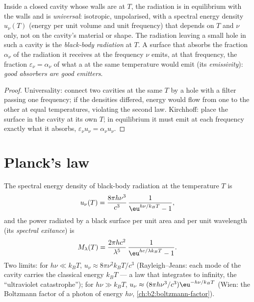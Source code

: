 \begin{proposition}\label{prop:b2:thermal-radiation:kirchhoff}
Inside a closed cavity whose walls are at $T$, the radiation is in
equilibrium with the walls and is \emph{universal}: isotropic,
unpolarised, with a spectral energy density $u_\nu(T)$ (energy per unit
volume and unit frequency) that depends on $T$ and $\nu$ only, not on
the cavity's material or shape. The radiation leaving a small hole in
such a cavity is the \emph{black-body radiation} at $T$. A surface that
absorbs the fraction $\alpha_\nu$ of the radiation it receives at the
frequency $\nu$ emits, at that frequency, the fraction
$\varepsilon_\nu = \alpha_\nu$ of what a  at the same
temperature would emit (its \emph{emissivity}):
\emph{good absorbers are good emitters}.
\end{proposition}

\begin{proof}
Universality: connect two cavities at the same $T$ by a hole with a
filter passing one frequency; if the densities differed, energy would
flow from one to the other at equal temperatures, violating the second
law. Kirchhoff: place the surface in the cavity at its own $T$; in
equilibrium it must emit at each frequency exactly what it absorbs,
$\varepsilon_\nu u_\nu = \alpha_\nu u_\nu$.
\end{proof}

\section{Planck's law}

\begin{theorem}\label{thm:b2:thermal-radiation:planck}
The spectral energy density of black-body radiation at the temperature
$T$ is
\[
u_\nu(T) = \frac{8\pi h\nu^3}{c^3}\,\frac{1}{\eu^{h\nu/k_BT} - 1},
\]
and the power radiated by a black surface per unit area and per unit
wavelength (its \emph{spectral exitance}) is
\[
M_\lambda(T) = \frac{2\pi hc^2}{\lambda^5}\,\frac{1}{\eu^{hc/\lambda k_BT} - 1}.
\]
Two limits: for $h\nu \ll k_BT$, $u_\nu \approx 8\pi\nu^2 k_BT/c^3$
(Rayleigh--Jeans: each mode of the cavity carries the classical energy
$k_BT$ --- a law that integrates to infinity, the ``ultraviolet
catastrophe''); for $h\nu \gg k_BT$, $u_\nu \approx (8\pi h\nu^3/c^3)
\eu^{-h\nu/k_BT}$ (Wien: the Boltzmann factor of a photon of energy
$h\nu$, \cref{ch:b2:boltzmann-factor}).
\end{theorem}

